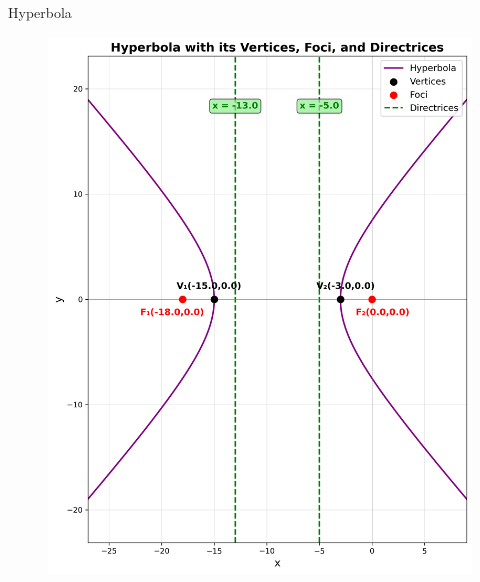\documentclass{beamer}
\begin{document}
\begin{frame}{Hyperbola}
\begin{figure}
   \centering
    \includegraphics[width=\columnwidth, height=0.8\textheight, keepaspectratio]{figs/fig3.png}
    \label{fig:Beamer/figs/fig3.png}
\end{figure}
\end{frame}
\end{document}
